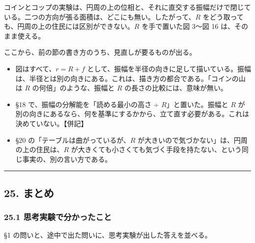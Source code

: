\documentclass[
  a4paper,
]{ltjsarticle}
\providecommand{\tightlist}{%
  \setlength{\itemsep}{0pt}\setlength{\parskip}{0pt}}
\begin{document}
コインとコップの実験は、円周の上の位相と、それに直交する振幅だけで閉じている。二つの方向が張る面積は、どこにも無い。したがって、\(R\)
をどう取っても、円周の上の住民には区別ができない。\(R\) を手で置いた図
3〜図 16 は、そのまま使える。

ここから、前の節の書き方のうち、見直しが要るものが出る。

\begin{itemize}
\tightlist
\item
  図はすべて、\(r=R+f\)
  として、振幅を半径の向きに足して描いている。振幅は、半径とは別の向きにある。これは、描き方の都合である。「コインの山は
  \(R\) の何倍」のような、振幅と \(R\) の長さの比較には、意味が無い。
\item
  §18 で、振幅の分解能を「読める最小の高さ ÷ \(R\)」と置いた。振幅と
  \(R\)
  が別の向きにあるなら、何を基準にするかから、立て直す必要がある。これは決めていない。【併記】
\item
  §20 の「テーブルは曲がっているが、\(R\)
  が大きいので気づかない」は、円周の上の住民は、\(R\)
  が大きくても小さくても気づく手段を持たない、という同じ事実の、別の言い方である。
\end{itemize}

\begin{center}\rule{0.5\linewidth}{0.5pt}\end{center}

\subsection{25. まとめ}\label{ux307eux3068ux3081}

\subsubsection{25.1
思考実験で分かったこと}\label{ux601dux8003ux5b9fux9a13ux3067ux5206ux304bux3063ux305fux3053ux3068}

§1 の問いと、途中で出た問いに、思考実験が出した答えを並べる。
\end{document}

